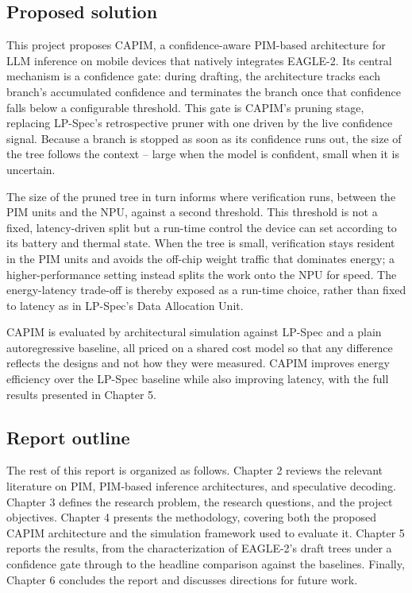 \documentclass[11pt]{article}
\begin{document}
\subsection{Proposed solution}
This project proposes CAPIM, a confidence-aware PIM-based architecture for LLM inference on mobile devices that natively integrates EAGLE-2. Its central mechanism is a confidence gate: during drafting, the architecture tracks each branch's accumulated confidence and terminates the branch once that confidence falls below a configurable threshold. This gate is CAPIM's pruning stage, replacing LP-Spec's retrospective pruner with one driven by the live confidence signal. Because a branch is stopped as soon as its confidence runs out, the size of the tree follows the context -- large when the model is confident, small when it is uncertain.

The size of the pruned tree in turn informs where verification runs, between the PIM units and the NPU, against a second threshold. This threshold is not a fixed, latency-driven split but a run-time control the device can set according to its battery and thermal state. When the tree is small, verification stays resident in the PIM units and avoids the off-chip weight traffic that dominates energy; a higher-performance setting instead splits the work onto the NPU for speed. The energy-latency trade-off is thereby exposed as a run-time choice, rather than fixed to latency as in LP-Spec's Data Allocation Unit.

CAPIM is evaluated by architectural simulation against LP-Spec and a plain autoregressive baseline, all priced on a shared cost model so that any difference reflects the designs and not how they were measured. CAPIM improves energy efficiency over the LP-Spec baseline while also improving latency, with the full results presented in Chapter 5.

\subsection{Report outline}
The rest of this report is organized as follows. Chapter 2 reviews the relevant literature on PIM, PIM-based inference architectures, and speculative decoding. Chapter 3 defines the research problem, the research questions, and the project objectives. Chapter 4 presents the methodology, covering both the proposed CAPIM architecture and the simulation framework used to evaluate it. Chapter 5 reports the results, from the characterization of EAGLE-2's draft trees under a confidence gate through to the headline comparison against the baselines. Finally, Chapter 6 concludes the report and discusses directions for future work.
\end{document}
